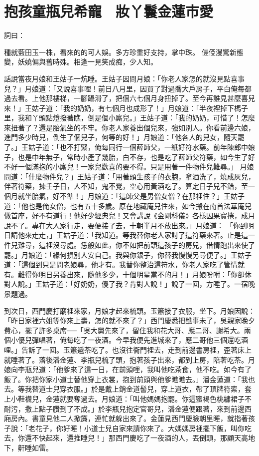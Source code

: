 %

\chapter{抱孩童瓶兒希寵　妝丫鬟金蓮市愛}

詞曰：

種就藍田玉一株，看來的的可人娛。多方珍重好支持，掌中珠。
傞俹漫驚新態變，妖嬈偏與舊時殊。相逢一見笑成痴，少人知。

話說當夜月娘和王姑子一炕睡。王姑子因問月娘：「你老人家怎的就沒見點喜事兒？」月娘道：「又說喜事哩！前日八月里，因買了對過喬大戶房子，平白俺每都過去看。上他那樓梯，一腳躡滑了，把個六七個月身扭掉了。至今再誰見甚麼喜兒來！」王姑子道：「我的奶奶，有七個月也成形了！」月娘道：「半夜裡掉下榪子里，我和丫頭點燈撥著瞧，倒是個小廝兒。」王姑子道：「我的奶奶，可惜了！怎麼來扭著了？還是胎氣坐的不牢。你老人家養出個兒來，強如別人。你看前邊六娘，進門多少時兒，倒生了個兒子，何等的好！」月娘道：「他各人的兒女，隨天罷了。」王姑子道：「也不打緊，俺每同行一個薛師父，一紙好符水藥。前年陳郎中娘子，也是中年無子，常時小產了幾胎，白不存，也是吃了薛師父符藥，如今生了好不好一個滿抱的小廝兒！一家兒歡喜的要不得。只是用著一件物件兒難尋。」 月娘問道：「什麼物件兒？」王姑子道：「用著頭生孩子的衣胞，拿酒洗了，燒成灰兒，伴著符藥，揀壬子日，人不知，鬼不覺，空心用黃酒吃了。算定日子兒不錯，至一個月就坐胎氣，好不準！」月娘道：「這師父是男僧女僧？在那裡住？」王姑子道：「他也是俺女僧，也有五十多歲。原在地藏庵兒住來，如今搬在南首法華庵兒做首座，好不有道行！他好少經典兒！又會講說《金剛科儀》各樣因果寶捲，成月說不了。專在大人家行走，要便接了去，十朝半月不放出來。」月娘道： 「你到明日請他來走走，」王姑子道：「我知道。等我替你老人家討了這符藥來著。止是這一件兒難尋，這裡沒尋處。恁般如此，你不如把前頭這孩子的房兒，借情跑出來使了罷。」月娘道：「緣何損別人安自己。我與你銀子，你替我慢慢另尋便了。」王姑子道：「這個到只是問老娘尋，他才有。我替你整治這符水，你老人家吃了管情就有。難得你明日另養出來，隨他多少，十個明星當不的月！」月娘吩咐：「你卻休對人說。」王姑子道：「好奶奶，傻了我？肯對人說！」說了一回，方睡了。一宿晚景題過。

到次日，西門慶打廟裡來家，月娘才起來梳頭。玉簫接了衣服，坐下。月娘因說：「昨日家裡六姐等你來上壽，怎的就不來了？」西門慶悉把醮事未了，吳親家晚夕費心，擺了許多桌席──「吳大舅先來了，留住我和花大哥、應二哥、謝希大。兩個小優兒彈唱著，俺每吃了一夜酒。今早我便先進城來了，應二哥他三個還吃酒哩。」告訴了一回。玉簫遞茶吃了。也沒往衙門裡去，走到前邊書房裡，歪著床上就睡著了。落後潘金蓮、李瓶兒梳了頭，抱著孩子出來，都到上房，陪著吃茶。月娘向李瓶兒道：「他爹來了這一日，在前頭哩，我叫他吃茶食，他不吃。如今有了飯了。你把你家小道士替他穿上衣裳，抱到前頭與他爹瞧瞧去。」潘金蓮道：「我也去。等我替道士兒穿衣服。」於是戴上銷金道髻兒，穿上道衣，帶了頂牌符索，套上小鞋襪兒，金蓮就要奪過去。月娘道：「叫他媽媽抱罷。你這蜜褐色桃繡裙子不耐污，撒上點子臢到了不成。」於李瓶兒抱定官哥兒，潘金蓮便跟著，來到前邊西廂房內。書童見他二人掀簾，連忙就躲出來了。金蓮見西門慶臉朝里睡，就指著孩子說：「老花子，你好睡！小道士兒自家來請你來了。大媽媽房裡擺下飯，叫你吃去，你還不快起來，還推睡兒！」那西門慶吃了一夜酒的人，丟倒頭，那顧天高地下，鼾睡如雷。

